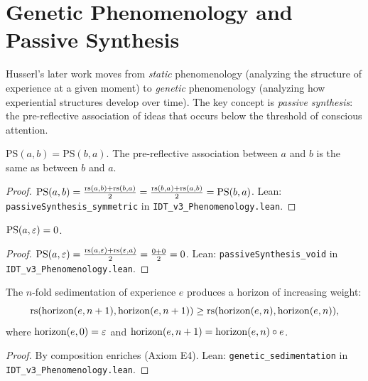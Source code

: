 \section{Genetic Phenomenology and Passive Synthesis}

Husserl's later work moves from \emph{static} phenomenology (analyzing the
structure of experience at a given moment) to \emph{genetic} phenomenology
(analyzing how experiential structures develop over time). The key concept
is \emph{passive synthesis}: the pre-reflective association of ideas that
occurs below the threshold of conscious attention.

\begin{theorem}
\label{thm:passive-symmetric-deep}
$\mathrm{PS}(a, b) = \mathrm{PS}(b, a)$.
The pre-reflective association between $a$ and $b$ is the same as between
$b$ and $a$.
\end{theorem}

\begin{proof}
$\mathrm{PS}(a, b) = \frac{\mathrm{rs}(a,b) + \mathrm{rs}(b,a)}{2}
= \frac{\mathrm{rs}(b,a) + \mathrm{rs}(a,b)}{2} = \mathrm{PS}(b, a)$.
Lean: \texttt{passiveSynthesis\_symmetric} in
\texttt{IDT\_v3\_Phenomenology.lean}.
\end{proof}

\begin{theorem}
\label{thm:passive-void}
$\mathrm{PS}(a, \varepsilon) = 0$.
\end{theorem}

\begin{proof}
$\mathrm{PS}(a, \varepsilon) = \frac{\mathrm{rs}(a, \varepsilon) + \mathrm{rs}(\varepsilon, a)}{2}
= \frac{0 + 0}{2} = 0$.
Lean: \texttt{passiveSynthesis\_void} in \texttt{IDT\_v3\_Phenomenology.lean}.
\end{proof}

\begin{theorem}
\label{thm:genetic-sedimentation}
The $n$-fold sedimentation of experience $e$ produces a horizon of increasing
weight:
\[
\mathrm{rs}(\mathrm{horizon}(e, n+1), \mathrm{horizon}(e, n+1)) \geq
\mathrm{rs}(\mathrm{horizon}(e, n), \mathrm{horizon}(e, n)),
\]
where $\mathrm{horizon}(e, 0) = \varepsilon$ and $\mathrm{horizon}(e, n+1) =
\mathrm{horizon}(e, n) \circ e$.
\end{theorem}

\begin{proof}
By composition enriches (Axiom E4).
Lean: \texttt{genetic\_sedimentation} in \texttt{IDT\_v3\_Phenomenology.lean}.
\end{proof}


